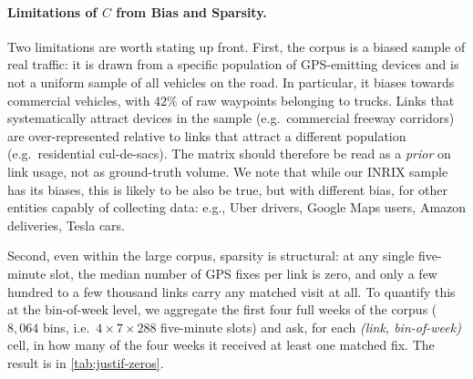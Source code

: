 \documentclass[sigconf, review]{acmart}
\begin{document}
\paragraph{Limitations of $C$ from Bias and Sparsity.}

Two limitations are worth stating up front. 
First, the corpus is a biased sample of real traffic: it is drawn from a specific population
of GPS-emitting devices and is not a uniform sample of all vehicles
on the road.  In particular, it biases towards commercial vehicles, with $42\%$ of raw waypoints belonging to trucks.  
Links that systematically attract devices in the
sample (e.g.\ commercial freeway corridors) are over-represented
relative to links that attract a different population
(e.g.\ residential cul-de-sacs). The matrix should therefore be
read as a \emph{prior} on link usage, not as ground-truth volume.
We note that while our INRIX sample has its biases, this is likely to be also be true, but with different bias, for other entities capably of collecting data: e.g., Uber drivers, Google Maps users, Amazon deliveries, Tesla cars.  


Second, even within the large corpus, sparsity is structural: at any
single five-minute slot, the median number of GPS fixes per link is
zero, and only a few hundred to a few thousand links carry any
matched visit at all. To quantify this at the bin-of-week level,
we aggregate the first four full weeks of the corpus ($8{,}064$
bins, i.e.\ $4 \times 7 \times 288$ five-minute slots) and ask, for
each \emph{(link, bin-of-week)} cell, in how many of the four
weeks it received at least one matched fix. The result is in
\cref{tab:justif-zeros}.
\end{document}
